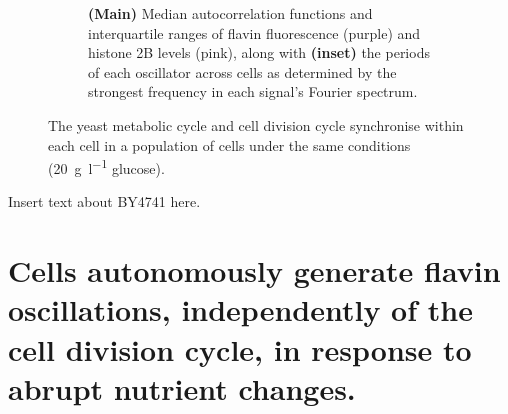 \begin{figure}
\begin{subfigure}[htpb]{0.4\textwidth}
   \caption{
     \textbf{(Main)} Median autocorrelation functions and interquartile ranges of flavin fluorescence (purple) and histone 2B levels (pink), %
     along with \textbf{(inset)} the periods of each oscillator across cells as determined by the strongest frequency in each signal's Fourier spectrum.
   }
   \label{fig:biology-by4741-sync-acf}
  \end{subfigure}

  \caption{
    The yeast metabolic cycle and cell division cycle synchronise within each cell in a population of cells under the same conditions (\SI{20}{\gram~\litre^{-1}} glucose).
  }
  \label{fig:biology-by4741-sync}
\end{figure}

Insert text about BY4741 here.


\section[Abrupt nutrient changes]{Cells autonomously generate flavin oscillations, independently of the cell division cycle, in response to abrupt nutrient changes.}
\label{sec:biology-abrupt}

